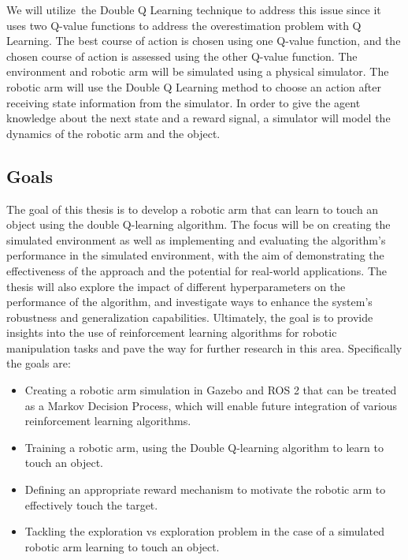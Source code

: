 \documentclass[12pt,oneside]{article}
\begin{document}
We will utilize the Double Q Learning technique to address this issue since it uses two Q-value functions to address the overestimation problem with Q Learning. The best course of action is chosen using one Q-value function, and the chosen course of action is assessed using the other Q-value function. The environment and robotic arm will be simulated using a physical simulator. The robotic arm will use the Double Q Learning method to choose an action after receiving state information from the simulator. In order to give the agent knowledge about the next state and a reward signal, a simulator will model the dynamics of the robotic arm and the object.

%
\subsection{Goals}\label{sec:goals}
The goal of this thesis is to develop a robotic arm that can learn to touch an object using the double Q-learning algorithm. The focus will be on creating the simulated environment as well as implementing and evaluating the algorithm's performance in the simulated environment, with the aim of demonstrating the effectiveness of the approach and the potential for real-world applications. The thesis will also explore the impact of different hyperparameters on the performance of the algorithm, and investigate ways to enhance the system's robustness and generalization capabilities. Ultimately, the goal is to provide insights into the use of reinforcement learning algorithms for robotic manipulation tasks and pave the way for further research in this area. Specifically the goals are:

\begin{itemize}
\item Creating a robotic arm simulation in Gazebo and ROS 2 that can be treated as a Markov Decision Process, which will enable future integration of various reinforcement learning algorithms.
\item Training a robotic arm, using the Double Q-learning algorithm to learn to touch an object.
\item Defining an appropriate reward mechanism to motivate the robotic arm to effectively touch the target.
\item Tackling the exploration vs exploration problem in the case of a simulated robotic arm learning to touch an object.

\end{itemize}
\end{document}
